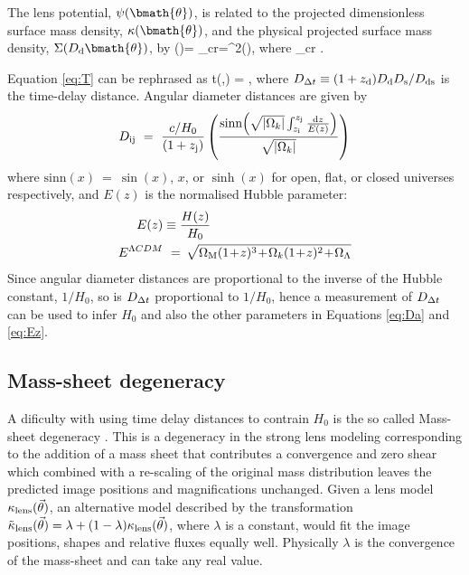 \documentclass[useAMS,usenatbib]{mn2e}
\begin{document}
The lens potential, $\psi(\bmath{\theta})$, is related to the projected dimensionless
surface mass density, $\kappa(\bmath{\theta})$, and the physical projected surface mass density,
$\Sigma(D_{\rm d} \bmath{\theta})$, by 
\be \label{eq:psiKappaDiffRelan}
\kappa(\bmath{\theta})=  {\Sigma_{\rm cr}}=\nabla^2\psi(\bmath{\theta}),
\ee
where 
\be \label{eq:sigcrit} 
\Sigma_{\rm cr} \equiv {}.
\ee

Equation \ref{eq:T} can be rephrased as
\be
\Delta t(\bmath{\theta},\bmath{\beta})  =  ,
\ee 
where $D_{\Delta t} \equiv (1+z_{\rm d}) D_{\rm d} D_{\rm s}/D_{\rm ds}$ is the time-delay distance.
Angular diameter distances are given by
\begin{equation}
D_{\mathrm{ij}}~=~ {c/H_0 \over {(1+z_{\mathrm{j}})}}\left( {\mathrm{sinn}\!\left( \sqrt{|\Omega_k|} \int_{z_{\mathrm{i}}}^{z_{\mathrm{j}}} {\mathrm{d} z \over E(z)}\right)\over \sqrt{|\Omega_k|}}\right)
\label{eq:Da}
\end{equation}
where $\mathrm{sinn}(x)~=~\sin(x)$, $x$, or $\sinh(x)$ for open, flat, or closed universes respectively, and $E(z)$ is the normalised Hubble parameter:
\begin{subequations}\label{Eq:Ez}
\begin{align}
E(z) &\equiv {H(z) \over H_0}\\
E^{\Lambda{CDM}}&~=~\!\sqrt{{\Omega_{\mathrm{M}}(1\!+\!z)^{3}\!+\!\Omega_k(1\!+\!z)^2\!+\!\Omega_{\Lambda}}}
\end{align}
\end{subequations}
Since angular diameter distances are proportional to the inverse of the Hubble constant, $1/H_0$,
so is $D_{\Delta t}$ proportional to $1/H_0$, hence a measurement of $D_{\Delta t}$ can be used to infer $H_0$
and also the other parameters in Equations \ref{eq:Da} and \ref{eq:Ez}. 


\subsection{Mass-sheet degeneracy}
\label{sec:H0theory:MSD}

A dificulty with using time delay distances to contrain $H_0$ is the so called
Mass-sheet degeneracy \citep[see e.g.][for details]{Falco1985,Schneider2006}.
This is a degeneracy in the strong lens modeling corresponding to the addition of a
mass sheet that contributes a convergence and zero shear which combined with a
re-scaling of the original mass distribution leaves the predicted image positions and
magnifications unchanged. Given a lens
model $\kappa_{\rm lens}(\vec{\theta})$, an alternative model described by the
transformation $\tilde{\kappa}_{\rm lens}(\vec{\theta}) = \lambda + (1-\lambda)
\kappa_{\rm lens}(\vec{\theta})$, where $\lambda$ is a constant,
would fit the image positions, shapes and relative fluxes equally well. Physically $\lambda$
is the convergence of the mass-sheet and can take any real value.
\end{document}
